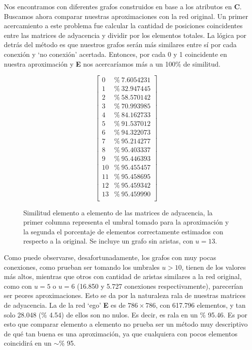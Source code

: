 Nos encontramos con diferentes grafos construidos en base a los atributos en \textbf{C}. Buscamos ahora comparar nuestras aproximaciones con la red original. 
Un primer acercamiento a este problema fue calcular la cantidad de posiciones coincidentes entre las matrices de adyacencia y dividir por los elementos totales. La lógica por detrás del método es que nuestros grafos serán más similares entre sí por cada conexión y `no conexión' acertada. Entonces, por cada 0 y 1 coincidente en nuestra aproximación y \textbf{E} nos acercaríamos más a un 100\% de similitud. 

\begin{figure}[!htbp]
\begin{equation*}
    \begin{bmatrix}
    0  &\%\ 7.6054231   \\
    1  &\%\ 32.947445   \\
    2  &\%\ 58.570142   \\
    3  &\%\ 70.993985   \\
    4  &\%\ 84.162733   \\
    5  &\%\ 91.537012   \\
    6  &\%\ 94.322073   \\
    7  &\%\ 95.214277   \\
    8  &\%\ 95.403337   \\
    9  &\%\ 95.446393   \\
    10 &\%\ 95.455457   \\
    11 &\%\ 95.458695   \\  
    12 &\%\ 95.459342   \\
    13 &\%\ 95.459990   \\
    \end{bmatrix}
\end{equation*}
\caption{Similitud elemento a elemento de las matrices de adyacencia, la primer columna representa el umbral tomado para la aproximación y la segunda el porcentaje de elementos correctamente estimados con respecto a la original. Se incluye un grafo sin aristas, con $u = 13$.} \label{promedio_similaridad}
\end{figure}

Como puede observarse, desafortunadamente, los grafos con muy pocas conexiones, como prueban ser tomando los umbrales $u > 10$, tienen de los valores más altos, mientras que otros con cantidad de aristas similares a la red original, como con $u = 5$ o $u = 6$ (16.850 y 5.727 conexiones respectivamente), parecerían ser peores aproximaciones. Esto se da por la naturaleza rala de nuestras matrices de adyacencia. La de la red `ego' \textbf{E} es de $786 \times 786$, con 617.796 elementos, y tan solo 28.048 (\% 4.54) de ellos son no nulos. Es decir, es rala en un \% 95.46. Es por esto que comparar elemento a elemento no prueba ser un método muy descriptivo de qué tan buena es una aproximación, ya que cualquiera con pocos elementos coincidirá en un $\sim$\% 95.

